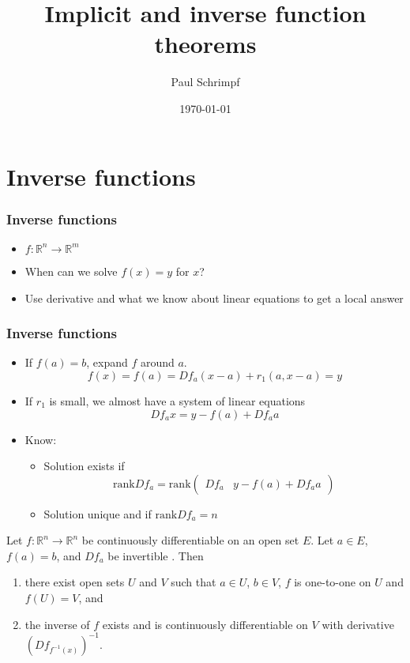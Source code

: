 \documentclass[compress]{beamer}
\title{Implicit and inverse function theorems}
\author{Paul Schrimpf}
\institute{UBC \\ Economics 526}
\date{\today}
\def\R{\mathbb{R}}
\newcommand{\rank}{\mathrm{rank}}
\renewcommand{\to}{{\rightarrow}}
\begin{document}
\frame{\titlepage}

\begin{frame}
  \tableofcontents  
\end{frame}

\section{Inverse functions}

\begin{frame}
  \frametitle{Inverse functions}
  \begin{itemize}
  \item $f:\R^n \to \R^m$
  \item When can we solve $f(x) = y$ for $x$? 
  \item Use derivative and what we know about linear equations to get
    a local answer  
  \end{itemize}
\end{frame}

\begin{frame}
  \frametitle{Inverse functions}
  \begin{itemize}
  \item If $f(a) = b$, expand $f$ around $a$.
    \[ f(x) = f(a) = Df_a(x-a) + r_1(a,x-a) = y\]
  \item If $r_1$ is small, we almost have a system of linear equations
    \[ Df_a x = y - f(a) + Df_a a \]
  \item Know:
    \begin{itemize}
    \item Solution exists if 
      \[ \rank Df_a =
      \rank \begin{pmatrix} Df_a &  y - f(a) + Df_a a \end{pmatrix} \]
    \item Solution unique and if $\rank Df_a = n$
    \end{itemize}
  \end{itemize}
\end{frame}

\begin{frame}
  \begin{theorem}
    Let $f: \R^n \to \R^n$ be continuously differentiable on an open set
    $E$. Let $a \in E$, $f(a) = b$, and $Df_a$ be invertible . Then 
    \begin{enumerate}
    \item there exist open sets $U$ and $V$ such that $a \in U$,
      $b \in
      V$, $f$ is one-to-one on $U$ and $f(U) = V$, and
    \item the inverse of $f$ exists and is continuously differentiable
      on $V$ with derivative $\left(Df_{f^{-1}(x)}\right)^{-1}$.
    \end{enumerate}
  \end{theorem}
\end{frame}
\end{document}
